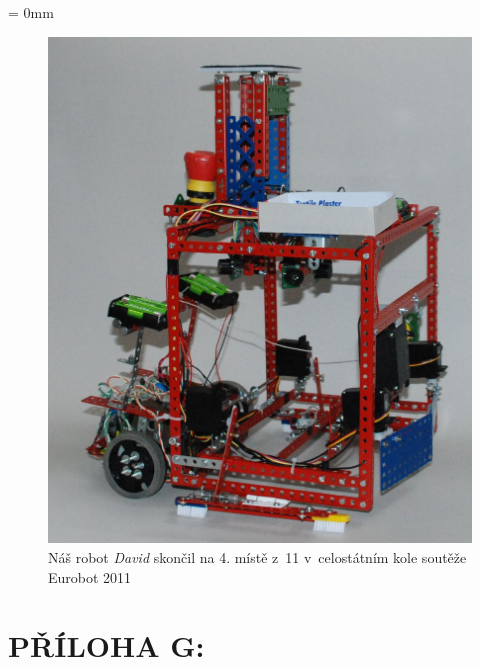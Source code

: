 \documentclass[12pt, a4paper, oneside]{article}
\newcommand{\It}{\textit}  %
\begin{document}
\pagestyle{plain}
\textheight=592pt
\textwidth=392pt
\newpage
\voffset = 0mm
\begin{figure}[H]
\begin{center}
\includegraphics[width=\textwidth]{img/use_david_robot.jpg}
\caption{Náš robot \It{David} skončil na 4. místě z~11 v~celostátním kole soutěže Eurobot 2011}
\label{david}
\end{center}
\end{figure}

\newpage
\section*{PŘÍLOHA G:}
~
\listoffigures   %
\end{document}
